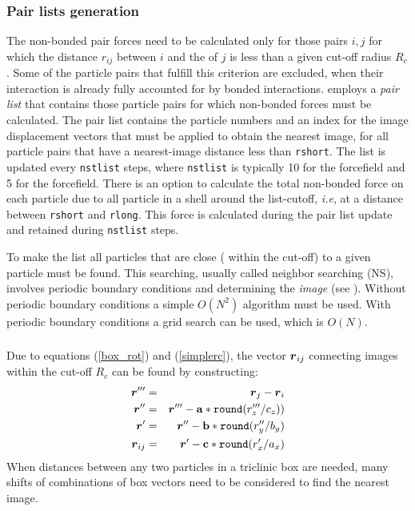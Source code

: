 \subsubsection{Pair lists generation}
The non-bonded pair forces need to be calculated only for those pairs
$i,j$  for which the distance $r_{ij}$ between $i$ and the 
of  $j$ is less than a given cut-off radius $R_c$. Some of the
particle pairs that fulfill this criterion are excluded, when their
interaction is already fully accounted for by bonded interactions.
{\gromacs} employs  a {\em pair list} that contains 
those  particle pairs for which non-bonded forces must be calculated.
The  pair list contains the particle numbers and an index for the image
displacement vectors that must be applied to  obtain the nearest
image, for  all particle pairs that
have a  nearest-image distance less than \verb'rshort'. The list is
updated  every \verb'nstlist' steps, where \verb'nstlist' is typically
10 for the {\gromacs} forcefield and 5 for the  forcefield.
There is an option to calculate the total non-bonded force
on each  particle due to all particle in a shell around the
list-cutoff, {\em  i.e}, at a distance between \verb'rshort' and
\verb'rlong'.  This force is calculated during the pair list update
and  retained during \verb'nstlist' steps.

To make the  list all particles that are close
({\ie} within the cut-off) to a given particle must be found.
This searching, usually called neighbor searching (NS),
involves periodic boundary conditions and determining the {\em image}
(see ). Without periodic boundary conditions a simple
$O(N^2)$ algorithm must be used. With periodic boundary conditions
a grid search can be used, which is $O(N)$.

\subsubsection{}
Due to equations (\ref{box_rot}) and (\ref{simplerc}), the vector $\mbox{\boldmath ${r}$}_{ij}$
connecting images within the cut-off $R_c$ can be found by constructing:
\begin{eqnarray}
\ve{r}'''   & = & \ve{r}_j-\ve{r}_i \\
\ve{r}''    & = & \ve{r}''' - {\bf a}*\verb'round'(r'''_z/c_z)) \\
\ve{r}'     & = & \ve{r}'' - {\bf b}*\verb'round'(r''_y/b_y) \\
\ve{r}_{ij} & = & \ve{r}' - {\bf c}*\verb'round'(r'_x/a_x)
\end{eqnarray}
When distances between any two particles in a triclinic box are needed,
many shifts of combinations of box vectors need to be considered to find
the nearest image.

